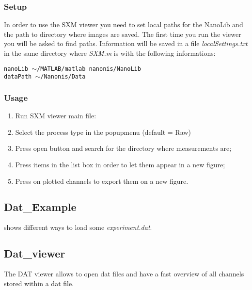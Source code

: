 \subsubsection*{Setup}
In order to use the SXM viewer you need to set local paths for the NanoLib and the path to directory where images are saved.
The first time you run the viewer you will be asked to find paths. 
Information will be saved in a file \emph{localSettings.txt} in the same directory  where \emph{SXM.m} is with the following informations:\\
\begin{minipage}{\textwidth}
	\setlength{\parindent}{15pt}
	\texttt{nanoLib	$\sim$/MATLAB/matlab\_nanonis/NanoLib}\\
	\indent \texttt{dataPath	$\sim$/Nanonis/Data}
\end{minipage}

\subsubsection*{Usage}
\begin{enumerate}
	\item Run SXM viewer main file: \\ 
	\item Select the process type in the popupmenu (default = Raw)
	\item Press open button and search for the directory where measurements are;
	\item Press items in the list box in order to let them appear in a new figure;
	\item Press on plotted channels to export them on a new figure.
\end{enumerate}

\subsection{Dat\_Example}
\bdf
\item[examples\_Dat] shows different ways to load some \emph{experiment.dat}.
\edf

\subsection{Dat\_viewer}
\label{dat::viewer}
The DAT viewer allows to open dat files and have a fast overview of all channels stored within a dat file.

